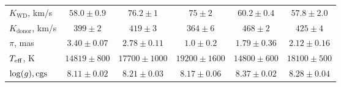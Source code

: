\begin{landscape}
\begin{table}
\begin{tabular}{lccccc}
            $K_\mathrm{WD}$, km/s      & $58.0\pm0.9$            & $76.2\pm1$               & $75\pm2$                  & $60.2\pm0.4$              & $57.8\pm2.0$ \\
            $K_\mathrm{donor}$, km/s   & $399\pm2$               & $419\pm3$                & $364\pm6$                 & $468\pm2$                 & $425\pm4$ \\
            \hline
            $\pi$, mas                 & $3.40\pm0.07$           & $2.78\pm0.11$            & $1.0\pm0.2$               & $1.79\pm0.36$             & $2.12\pm0.16$ \\
            $T_{\rm eff}$, K           & $14819\pm800$           & $17700\pm1000$           & $19200\pm1600$            & $14800\pm600$             & $18100\pm500$ \\
            $\log(g), {\rm cgs}$       & $8.11\pm0.02$           & $8.21\pm0.03$            & $8.17\pm0.06$             & $8.37\pm0.02$             & $8.28\pm0.04$ \\
            \hline
            \hline
        \end{tabular}
    \end{table}


\end{landscape}
